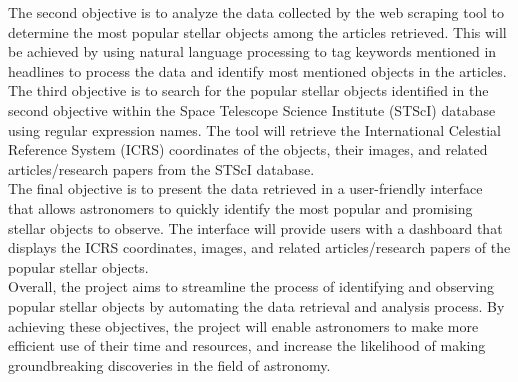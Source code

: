\documentclass[12pt,letterpaper]{article}
\begin{document}
The second objective is to analyze the data collected by the web scraping tool 
to determine the most popular stellar objects among the articles retrieved. This 
will be achieved by using natural language processing to tag keywords mentioned 
in headlines to process the data and identify most mentioned objects in the articles.\\

The third objective is to search for the popular stellar objects identified in 
the second objective within the Space Telescope Science Institute (STScI) database 
using regular expression names. The tool will retrieve the  International 
Celestial Reference System (ICRS) coordinates of the objects, their images, 
and related articles/research papers from the STScI database.\\

The final objective is to present the data retrieved in a user-friendly interface 
that allows astronomers to quickly identify the most popular and promising stellar 
objects to observe. The interface will provide users with a dashboard that displays 
the ICRS coordinates, images, and related articles/research papers of the popular 
stellar objects.\\

Overall, the project aims to streamline the process of identifying and observing 
popular stellar objects by automating the data retrieval and analysis process. 
By achieving these objectives, the project will enable astronomers to make more 
efficient use of their time and resources, and increase the likelihood of making 
groundbreaking discoveries in the field of astronomy.\\
\end{document}
